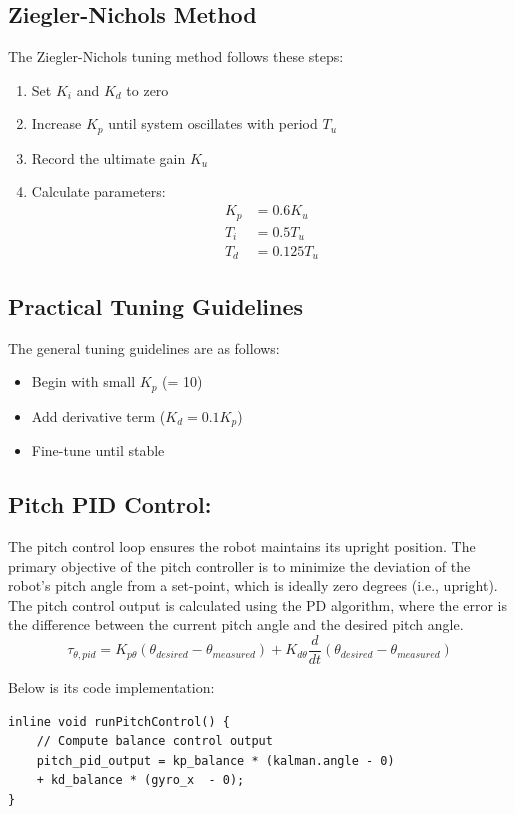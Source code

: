 \subsection{Ziegler-Nichols Method}
The Ziegler-Nichols tuning method follows these steps:
\begin{enumerate}
	\item Set $K_i$ and $K_d$ to zero
	\item Increase $K_p$ until system oscillates with period $T_u$
	\item Record the ultimate gain $K_u$
	\item Calculate parameters:
	\begin{align*}
		K_p &= 0.6K_u \\
		T_i &= 0.5T_u \\
		T_d &= 0.125T_u
	\end{align*}
\end{enumerate}

\subsection{Practical Tuning Guidelines}
The general tuning guidelines are as follows:

\begin{itemize}
	\item Begin with small $K_p$ (= 10)
	\item Add derivative term ($K_d = 0.1K_p$)
	\item Fine-tune until stable
\end{itemize}


\subsection{Pitch PID Control:}
The pitch control loop ensures the robot maintains its upright position. The primary objective of the pitch controller is to minimize the deviation of the robot's pitch angle from a set-point, which is ideally zero degrees (i.e., upright). The pitch control output is calculated using the PD algorithm, where the error is the difference between the current pitch angle and the desired pitch angle. 
\begin{equation}
	\tau_{\theta,pid} = K_{p\theta}({\theta_{desired} - \theta_{measured}}) + K_{d\theta}\frac{d}{dt}(\theta_{desired} - \theta_{measured})
\end{equation}

Below is its code implementation:
\begin{lstlisting}[style=cppstyle]
inline void runPitchControl() {
	// Compute balance control output
	pitch_pid_output = kp_balance * (kalman.angle - 0) 
	+ kd_balance * (gyro_x  - 0);
}
\end{lstlisting}

